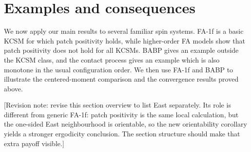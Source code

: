 \section{Examples and consequences}
\label{sec:applications}

%
%
%

We now apply our main results to several familiar spin systems. FA-1f is a
basic KCSM for which patch positivity holds, while higher-order FA models show
that patch positivity does not hold for all KCSMs. BABP gives an example
outside the KCSM class, and the contact process gives an example which is also
monotone in the usual configuration order. We then use FA-1f and BABP to
illustrate the centered-moment comparison and the convergence results proved
above.

\textcolor{revisionpurple}{[Revision note: revise this section overview to list
East separately. Its role is different from generic FA-1f: patch positivity is
the same local calculation, but the one-sided East neighbourhood is orientable,
so the new orientability corollary yields a stronger ergodicity conclusion.
The section structure should make that extra payoff visible.]}

%
%
%

